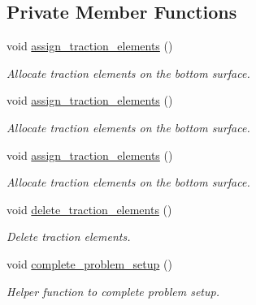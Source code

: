 \subsection*{Private Member Functions}
\begin{DoxyCompactItemize}
\item 
void \hyperlink{classFourierDecomposedTimeHarmonicLinearElasticityProblem_ab995077cbd92377b726d0ea0de81720e}{assign\+\_\+traction\+\_\+elements} ()
\begin{DoxyCompactList}\small\item\em Allocate traction elements on the bottom surface. \end{DoxyCompactList}\item 
void \hyperlink{classFourierDecomposedTimeHarmonicLinearElasticityProblem_ab995077cbd92377b726d0ea0de81720e}{assign\+\_\+traction\+\_\+elements} ()
\begin{DoxyCompactList}\small\item\em Allocate traction elements on the bottom surface. \end{DoxyCompactList}\item 
void \hyperlink{classFourierDecomposedTimeHarmonicLinearElasticityProblem_ab995077cbd92377b726d0ea0de81720e}{assign\+\_\+traction\+\_\+elements} ()
\begin{DoxyCompactList}\small\item\em Allocate traction elements on the bottom surface. \end{DoxyCompactList}\item 
void \hyperlink{classFourierDecomposedTimeHarmonicLinearElasticityProblem_ad51d1870683e0141c7854c583dd3916b}{delete\+\_\+traction\+\_\+elements} ()
\begin{DoxyCompactList}\small\item\em Delete traction elements. \end{DoxyCompactList}\item 
void \hyperlink{classFourierDecomposedTimeHarmonicLinearElasticityProblem_aeb3e1638026cb1cabf1b16a32496f63c}{complete\+\_\+problem\+\_\+setup} ()
\begin{DoxyCompactList}\small\item\em Helper function to complete problem setup. \end{DoxyCompactList}\end{DoxyCompactItemize}
